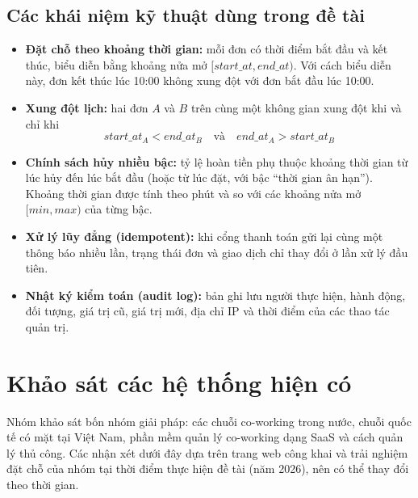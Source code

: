 \subsection{Các khái niệm kỹ thuật dùng trong đề tài}
\begin{itemize}
    \item \textbf{Đặt chỗ theo khoảng thời gian:} mỗi đơn có thời điểm bắt đầu và kết thúc, biểu diễn bằng khoảng nửa mở $[start\_at, end\_at)$. Với cách biểu diễn này, đơn kết thúc lúc 10:00 không xung đột với đơn bắt đầu lúc 10:00.
    \item \textbf{Xung đột lịch:} hai đơn $A$ và $B$ trên cùng một không gian xung đột khi và chỉ khi
    \begin{equation}
        start\_at_A < end\_at_B \quad \text{và} \quad end\_at_A > start\_at_B
        \label{eq:overlap}
    \end{equation}
    \item \textbf{Chính sách hủy nhiều bậc:} tỷ lệ hoàn tiền phụ thuộc khoảng thời gian từ lúc hủy đến lúc bắt đầu (hoặc từ lúc đặt, với bậc ``thời gian ân hạn''). Khoảng thời gian được tính theo phút và so với các khoảng nửa mở $[min, max)$ của từng bậc.
    \item \textbf{Xử lý lũy đẳng (idempotent):} khi cổng thanh toán gửi lại cùng một thông báo nhiều lần, trạng thái đơn và giao dịch chỉ thay đổi ở lần xử lý đầu tiên.
    \item \textbf{Nhật ký kiểm toán (audit log):} bản ghi lưu người thực hiện, hành động, đối tượng, giá trị cũ, giá trị mới, địa chỉ IP và thời điểm của các thao tác quản trị.
\end{itemize}

\section{Khảo sát các hệ thống hiện có}
\label{sec:khaosat_hethong}

Nhóm khảo sát bốn nhóm giải pháp: các chuỗi co-working trong nước, chuỗi quốc tế có mặt tại Việt Nam, phần mềm quản lý co-working dạng SaaS và cách quản lý thủ công. Các nhận xét dưới đây dựa trên trang web công khai và trải nghiệm đặt chỗ của nhóm tại thời điểm thực hiện đề tài (năm 2026), nên có thể thay đổi theo thời gian.

